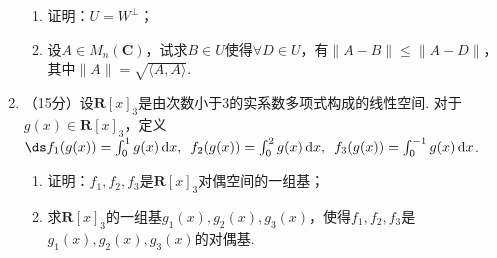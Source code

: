 \begin{enumerate}
\begin{enumerate}
        \item 证明：$U=W^{\perp}$；

        \item 设$A\in M_n(\mathbf{C})$，试求$B\in U$使得$\forall D\in U$，有$\lVert A-B \rVert\leqslant\lVert A-D \rVert$，其中$\lVert A \rVert=\sqrt{\langle A,A\rangle}$.
    \end{enumerate}

    \item （15分）设$\mathbf{R}[x]_3$是由次数小于3的实系数多项式构成的线性空间. 对于$g(x)\in\mathbf{R}[x]_3$，定义$\ds f_1(g(x))=\int_0^1g(x)\,\mathrm{d}x,\enspace f_2(g(x))=\int_0^2g(x)\,\mathrm{d}x,\enspace f_3(g(x))=\int_0^{-1}g(x)\,\mathrm{d}x$.
    \begin{enumerate}
        \item 证明：$f_1,f_2,f_3$是$\mathbf{R}[x]_3$对偶空间的一组基；

        \item 求$\mathbf{R}[x]_3$的一组基$g_1(x),g_2(x),g_3(x)$，使得$f_1,f_2,f_3$是$g_1(x),g_2(x),g_3(x)$的对偶基.
    \end{enumerate}
\end{enumerate}

\clearpage
